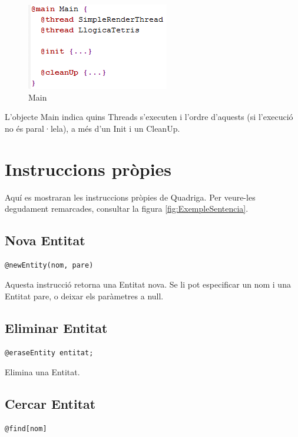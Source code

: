 \begin{figure}[h!]
  \includegraphics{./img/ExempleMain.png}
  \caption{Main}
\end{figure}

L'objecte Main indica quins Threads s'executen i l'ordre d'aquests (si l'execució no és paral·lela), a més d'un Init i un CleanUp.

\section{Instruccions pròpies}

Aquí es mostraran les instruccions pròpies de Quadriga. Per veure-les degudament remarcades, consultar la figura \ref{fig:ExempleSentencia}.

\subsection{Nova Entitat}

\begin{verbatim}
@newEntity(nom, pare)
\end{verbatim}

Aquesta instrucció retorna una Entitat nova. Se li pot especificar un nom i una Entitat pare, o deixar els paràmetres a null.

\subsection{Eliminar Entitat}

\begin{verbatim}
@eraseEntity entitat;
\end{verbatim}

Elimina una Entitat.

\subsection{Cercar Entitat}

\begin{verbatim}
@find[nom]
\end{verbatim}

